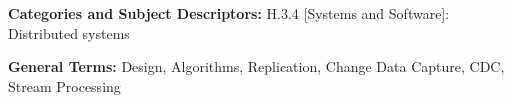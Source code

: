\documentclass{sig-alternate11pt1col}
\begin{document}
\maketitle


\noindent
{\bf Categories and Subject Descriptors:} H.3.4 {[Systems and
    Software]}: {Distributed systems}

\noindent
{\bf General Terms:} Design, Algorithms, Replication, Change Data Capture, CDC, Stream Processing












\end{document}
